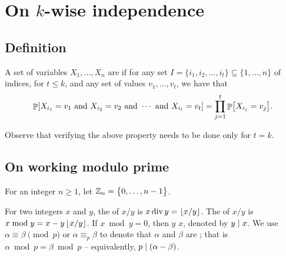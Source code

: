 \section{On $k$-wise independence}

\subsection{Definition}

\begin{defn}
    A set of variables $X_1, \ldots, X_n$ are  if for any set $I = \{i_1, i_2, \ldots, i_t\} \subseteq \{1,\ldots,n\}$ of
    indices, for $t \leq k$, and any set of values $v_1, \ldots, v_t$,
    we have that
    \begin{equation*}
        \Prob{
           X_{i_1} = v_1 \text{ and }
           X_{i_2} = v_2 \text{ and } \cdots \text{ and }
           X_{i_t} = v_t}%
        =%
        \prod_{j=1}^t        
        \Prob{X_{i_j} = v_j}.
    \end{equation*}
\end{defn}

Observe that verifying the above property needs to be done only for
$t=k$.


\subsection{On working modulo prime}

\begin{defn}
    For an integer $n \geq 1$, let $\mathbb{Z}_n = \left\{ {0, \ldots, n-1 \bigl. } \right\}$.
    
    For two integers $x$ and $y$, the  of $x/y$
    is $x \mathop{\mathrm{div}} y = \left\lfloor {x/y} \right\rfloor$. The  of $x/y$ is
    $x \bmod y = x - y \left\lfloor {x/y} \right\rfloor$. If $x \bmod y = 0$, then $y$
     $x$, denoted by $y \mid x$.  We use
    $\alpha \equiv \beta \pmod{p}$ or $\alpha \equiv_p \beta$ to
    denote that $\alpha$ and $\beta$ are ;
    that is $\alpha \bmod p = \beta \bmod p$ -- equivalently,
    $p \divides \pth[]{\alpha - \beta}$.
\end{defn}

